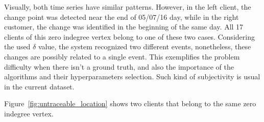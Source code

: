 Visually, both time series have similar patterns.
However, in the left client, the change point was detected near the end of
05/07/16 day, while in the right customer, the change was identified in the
beginning of the same day.
All 17 clients of this zero indegree vertex belong to one of these two cases.
Considering the used $\delta$ value, the system recognized two different
events, nonetheless, these changes are possibly related to a single event.
This exemplifies the problem difficulty when there isn't a ground truth,
and also the importance of the algorithms and their hyperparameters selection.
Such kind of subjectivity is usual in the current dataset.

Figure~\ref{fig:untraceable_location} shows two clients that belong to the same
zero indegree vertex.

\begin{figure}[H]
    \centering
\end{figure}
